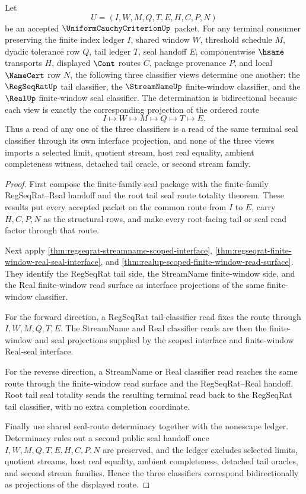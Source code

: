 \begin{theorem}
\label{thm:uniform-cauchy-criterion-terminal-regseq-real-classifier-correspondence}
Let
$$
U=(I,W,M,Q,T,E,H,C,P,N)
$$
be an accepted $\UniformCauchyCriterionUp$ packet. For any terminal consumer preserving the finite index ledger $I$, shared window $W$, threshold schedule $M$, dyadic tolerance row $Q$, tail ledger $T$, seal handoff $E$, componentwise $\hsame$ transports $H$, displayed $\Cont$ routes $C$, package provenance $P$, and local $\NameCert$ row $N$, the following three classifier views determine one another:
the $\RegSeqRatUp$ tail classifier, the $\StreamNameUp$ finite-window classifier, and the $\RealUp$ finite-window seal classifier.
The determination is bidirectional because each view is exactly the corresponding projection of the ordered route
$$
I \longmapsto W \longmapsto M \longmapsto Q \longmapsto T \longmapsto E.
$$
Thus a read of any one of the three classifiers is a read of the same terminal seal classifier through its own interface projection, and none of the three views imports a selected limit, quotient stream, host real equality, ambient completeness witness, detached tail oracle, or second stream family.
\end{theorem}
\begin{proof}
First compose the finite-family seal package with the finite-family RegSeqRat--Real handoff and the root tail seal route totality theorem. These results put every accepted packet on the common route from $I$ to $E$, carry $H,C,P,N$ as the structural rows, and make every root-facing tail or seal read factor through that route.

Next apply \autoref{thm:regseqrat-streamname-scoped-interface}, \autoref{thm:regseqrat-finite-window-real-seal-interface}, and \autoref{thm:realup-scoped-finite-window-read-surface}. They identify the RegSeqRat tail side, the StreamName finite-window side, and the Real finite-window read surface as interface projections of the same finite-window classifier.

For the forward direction, a RegSeqRat tail-classifier read fixes the route through $I,W,M,Q,T,E$. The StreamName and Real classifier reads are then the finite-window and seal projections supplied by the scoped interface and finite-window Real-seal interface.

For the reverse direction, a StreamName or Real classifier read reaches the same route through the finite-window read surface and the RegSeqRat--Real handoff. Root tail seal totality sends the resulting terminal read back to the RegSeqRat tail classifier, with no extra completion coordinate.

Finally use shared seal-route determinacy together with the nonescape ledger. Determinacy rules out a second public seal handoff once $I,W,M,Q,T,E,H,C,P,N$ are preserved, and the ledger excludes selected limits, quotient streams, host real equality, ambient completeness, detached tail oracles, and second stream families. Hence the three classifiers correspond bidirectionally as projections of the displayed route.
\end{proof}

